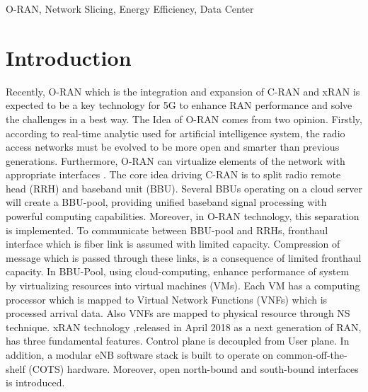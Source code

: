 \documentclass[conference]{IEEEtran}
\begin{document}
\begin{IEEEkeywords}
O-RAN, Network Slicing, Energy Efficiency, Data Center
\end{IEEEkeywords}

\section{Introduction}
Recently, O-RAN which is the integration and expansion of C-RAN and xRAN is expected to be a key technology for 5G to enhance RAN performance and solve the challenges in a best way.  
The Idea of O-RAN comes from two opinion. Firstly, according to real-time analytic used for artificial intelligence system, the radio access networks must be evolved to be more open and smarter than previous generations. Furthermore, O-RAN can virtualize elements of the network with  appropriate interfaces \cite{orant}. \newline
The core idea driving C-RAN is to split radio remote head (RRH) and baseband unit (BBU). Several BBUs operating on a cloud server will create a BBU-pool, providing unified baseband signal processing with powerful computing capabilities. Moreover, in O-RAN technology, this separation is implemented\cite{cran1}.
To communicate between BBU-pool and RRHs, fronthaul interface which is fiber link is assumed with limited capacity. Compression of message which is passed through these links, is a consequence of limited fronthaul capacity\cite{frdl,simeone2016cloud}.
In BBU-Pool, using cloud-computing, enhance performance of system by virtualizing resources
into virtual machines (VMs).
Each VM has a computing processor which is mapped to Virtual Network Functions (VNFs) which is processed arrival data. Also VNFs are mapped to physical resource through NS technique\cite{frdl,luong2018novel,luong2018novel1}. 
\newline
xRAN technology ,released in April 2018 as a next generation of RAN, has three fundamental features. Control plane is decoupled from User plane. In addition, a modular eNB software stack is built to operate on common-off-the-shelf (COTS) hardware. Moreover, open north-bound and south-bound interfaces is introduced\cite{xran}.
\end{document}

